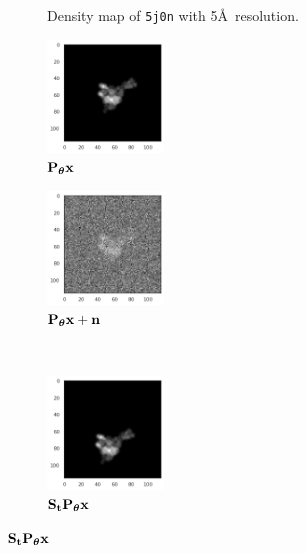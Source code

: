 \begin{figure}[ht!]
\begin{minipage}[b]{0.45\linewidth}
\begin{subfigure}[b]{0.46\linewidth}
            \caption{Density map of \texttt{5j0n} with 5\AA\ resolution.}
        \end{subfigure}
        \caption{%
            Two proteins with different symmetries.
        }\label{fig:pdb-proteins}
    \end{minipage}
    \hfill
    \begin{minipage}[b]{0.45\linewidth}
        \centering
        \begin{subfigure}[b]{0.49\linewidth}
            \centering
            \includegraphics[height=3cm]{figures/5j0n_noise0}
            \caption{$\mathbf{P}_{{\boldsymbol{\theta}}} \mathbf{x}$}
        \end{subfigure}
        \hfill
        \begin{subfigure}[b]{0.49\linewidth}
            \centering
            \includegraphics[height=3cm]{figures/5j0n_noise16}
            \caption{$\mathbf{P}_{{\boldsymbol{\theta}}} \mathbf{x} + \mathbf{n}$}
        \end{subfigure}
        \\ \vspace{0.5em}
        \begin{subfigure}[b]{0.49\linewidth}
            \centering
            \includegraphics[height=3cm]{figures/5j0n_translated}
            \caption{$\mathbf{S}_{\mathbf{t}} \mathbf{P}_{{\boldsymbol{\theta}}} \mathbf{x}$}
        \end{subfigure}

\end{minipage}
\end{figure}
